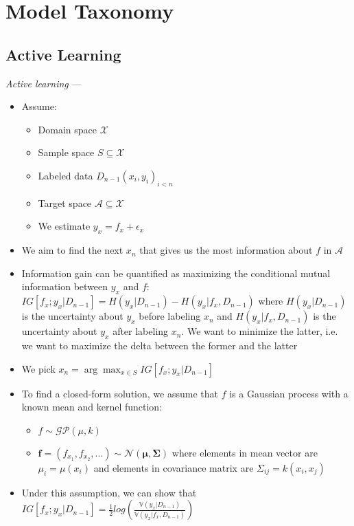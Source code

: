 \section{Model Taxonomy}
\subsection*{Active Learning}
\emph{Active learning} ---
\begin{itemize}
    \item Assume:
    \begin{itemize}
        \item Domain space $\mathcal{X}$ 
        \item Sample space $S \subseteq \mathcal{X}$
        \item Labeled data $D_{n-1} {(x_i, y_i)}_{i < n}$
        \item Target space $\mathcal{A} \subseteq \mathcal{X}$
        \item We estimate $y_x = f_x + \epsilon_x$
    \end{itemize}
    \item We aim to find the next $x_n$ that gives us the most information about $f$ in $\mathcal{A}$
    \item Information gain can be quantified as maximizing the conditional mutual information between $y_x$ and $f$: $IG [ f_x; y_x | D_{n-1} ] = H(y_x | D_{n-1}) - H(y_x | f_x, D_{n-1})$ where $H(y_x | D_{n-1})$ is the uncertainty about $y_x$ before labeling $x_n$ and $H(y_x | f_x, D_{n-1})$ is the uncertainty about $y_x$ after labeling $x_n$. We want to minimize the latter, i.e. we want to maximize the delta between the former and the latter
    \item We pick $x_n = \arg\max_{x \in S} IG [ f_x; y_x | D_{n-1} ]$ 
    \item To find a closed-form solution, we assume that $f$ is a Gaussian process with a known mean and kernel function:
    \begin{itemize}
        \item $f \sim \mathcal{G}\mathcal{P} (\mu, k)$
        \item $\boldsymbol{f} = (f_{x_1}, f_{x_2}, ...) \sim \mathcal{N} (\boldsymbol{\mu}, \boldsymbol{\Sigma})$ where elements in mean vector are $\mu_i = \mu(x_i)$ and elements in covariance matrix are $\Sigma_{ij} = k(x_i,x_j)$
    \end{itemize}
    \item Under this assumption, we can show that $IG [ f_x; y_x | D_{n-1} ] = \frac{1}{2} log( \frac{ \mathbb{V} (y_x | D_{n-1}) }{ \mathbb{V} (y_x | f_x, D_{n-1}) } )$\\

\end{itemize}
